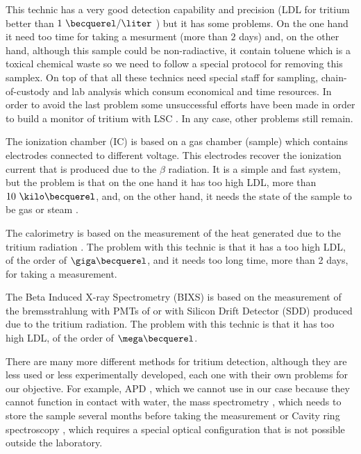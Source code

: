 This technic has a very good detection capability and precision (LDL for tritium better than $1~\becquerel/\liter$ \cite{0.6Bq_L}) but it has some problems. On the one hand it need too time for taking a mesurment (more than $2$ days) and, on the other hand, although this sample could be non-radiactive, it contain toluene which is a toxical chemical waste so we need to follow a special protocol for removing this samplex. On top of that all these technics need special staff for sampling, chain-of-custody and lab analysis which consum economical and time resources. In order to avoid the last problem some unsuccessful efforts have been made in order to build a monitor of tritium with LSC \cite{OnlineLSC}. In any case, other problems still remain. 

The ionization chamber (IC) is based on a gas chamber (sample) which contains electrodes connected to different voltage. This electrodes recover the ionization current that is produced due to the $\beta$ radiation. It is a simple and fast system, but the problem is that on the one hand it has too high LDL, more than $ 10~\kilo\becquerel$, and, on the other hand, it needs the state of the sample to be gas or steam \cite{IonizationChamber1, IonizationChamber2}.

The calorimetry is based on the measurement of the heat generated due to the tritium radiation \cite{Calorimeter1, Calorimeter2}. The problem with this technic is that it has a too high LDL, of the order of $\giga\becquerel$, and it needs too long time, more than 2 days, for taking a measurement.

The Beta Induced X-ray Spectrometry (BIXS) is based on the measurement of the bremsstrahlung with PMTs of  \cite{XRays1, XRays2} or with Silicon Drift Detector (SDD) \cite{Bremstrahlung} produced due to the tritium radiation. The problem with this technic is that it has too high LDL, of the order of $\mega\becquerel$.

There are many more different methods for tritium detection, although they are less used or less experimentally developed, each one with their own problems for our objective. For example,  APD \cite{APD}, which we cannot use in our case because they cannot function in contact with water, the mass spectrometry \cite{Spectrometry}, which needs to store the sample several months before taking the measurement or Cavity ring spectroscopy \cite{Ring}, which requires a special optical configuration that is not possible outside the laboratory.

